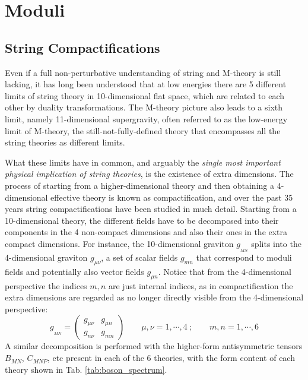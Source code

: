  

\section{Moduli}
\label{ModuliSection}

\subsection{String Compactifications}

Even if a full non-perturbative understanding of string and M-theory is still lacking, it has long been understood that at low energies there are 5
different limits of string theory in 10-dimensional flat space, which are related to each other by duality transformations. 
The M-theory picture also leads to a sixth limit, namely 11-dimensional supergravity, often referred to as the low-energy limit of M-theory, the still-not-fully-defined theory that encompasses all the string theories as different limits. 

What these limits have in common, and arguably the \emph{single most important physical implication of string theories}, is the existence of extra dimensions. The process of starting from a higher-dimensional theory and then obtaining a 4-dimensional effective theory is known as compactification, and over the past 35 years string compactifications have been studied in much detail. Starting from a 10-dimensional theory, the different fields have to be decomposed into their components in the 4 non-compact dimensions and also their ones in the extra compact dimensions. For instance, the 10-dimensional graviton $ g_{_{MN}} $ splits into the 4-dimensional graviton $g_{\mu\nu}$, a set of scalar fields $g_{mn}$ that correspond to moduli fields and potentially also vector fields $g_{\mu n}$. Notice that from the 4-dimensional perspective the indices $m,n$ are just internal indices, as in compactification the extra dimensions are regarded as no longer directly visible from the 4-dimensional perspective:
\begin{equation}
g_{_{MN}}=\begin{pmatrix} g_{\mu\nu} & g_{\mu n} \\
g_{n\nu} & g_{mn}
\end{pmatrix}\qquad \mu,\nu =1, \cdots, 4\ ; \qquad m,n=1,\cdots, 6
\end{equation}
A similar decomposition is performed with the higher-form antisymmetric tensors $B_{MN}$, $C_{MNP}$, etc present in each of the 6 theories, with the form content of each theory shown in Tab. \ref{tab:boson_spectrum}.

